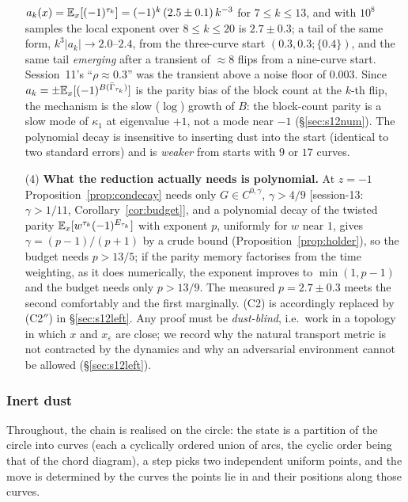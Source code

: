 \begin{enumerate}[leftmargin=2.2em]
$a_k(x)=\E_x[(-1)^{\tau_k}]=(-1)^k\,(2.5\pm0.1)\,k^{-3}$ for
$7\le k\le13$, and with $10^8$ samples the local exponent over
$8\le k\le20$ is $2.7\pm0.3$; a tail of the same form,
$k^3|a_k|\to2.0$--$2.4$, from the three-curve start $(0.3,0.3;\{0.4\})$,
and the same tail \emph{emerging} after a transient of $\approx8$
flips from a nine-curve start.  Session~11's ``$\rho\approx0.3$''
was the transient above a noise floor of $0.003$.  Since
$a_k=\pm\E_x[(-1)^{B(\bar\Gamma_{\tau_k})}]$ is the parity bias of the
block count at the $k$-th flip, the mechanism is the slow ($\log$)
growth of $B$: the block-count parity is a slow mode of $\kappa_1$ at
eigenvalue $+1$, not a mode near $-1$ (\S\ref{sec:s12num}).  The
polynomial decay is insensitive to inserting dust into the start
(identical to two standard errors) and is \emph{weaker} from starts
with $9$ or $17$ curves.
\item[(4)] \textbf{What the reduction actually needs is polynomial.}
At $z=-1$ Proposition~\ref{prop:condecay} needs only
$G\in C^{0,\gamma}$, $\gamma>4/9$ [session-13: $\gamma>1/11$, Corollary~\ref{cor:budget}], and a polynomial decay of the
twisted parity $\mathbb{E}_x[w^{\tau_k}(-1)^{E_{\tau_k}}]$ with exponent $p$,
uniformly for $w$ near $1$, gives $\gamma=(p-1)/(p+1)$ by a crude
bound (Proposition~\ref{prop:holder}), so the budget needs $p>13/5$;
if the parity memory factorises from the time weighting, as it does
numerically, the exponent improves to $\min(1,p-1)$ and the budget
needs only $p>13/9$.  The measured $p=2.7\pm0.3$ meets the second
comfortably and the first marginally.  (C2) is accordingly replaced by
(C2$''$) in \S\ref{sec:s12left}.  Any proof must be \emph{dust-blind},
i.e.\ work in a topology in which $x$ and $x_\varepsilon$ are close;
we record why the natural transport metric is not contracted by the
dynamics and why an adversarial environment cannot be allowed
(\S\ref{sec:s12left}).
\end{enumerate}

\subsubsection{Inert dust}\label{sec:s12dust}

Throughout, the chain is realised on the circle: the state is a
partition of the circle into curves (each a cyclically ordered union of
arcs, the cyclic order being that of the chord diagram), a step picks
two independent uniform points, and the move is determined by the
curves the points lie in and their positions along those curves.

